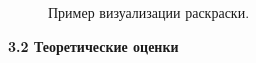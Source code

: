 \FloatBarrier
\begin{figure}[!h]
\centering
\captionsetup{justification=centering}



\caption{Пример визуализации раскраски.}
\label{chapter3:fig:viz}
\end{figure}

\vspace{5pt}
\textbf{3.2 Теоретические оценки}\label{chapters:3.2}
\vspace{5pt}

